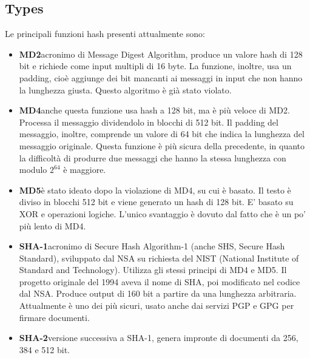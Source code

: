 \subsection{Types}
Le principali funzioni hash presenti attualmente sono:
\begin{itemize}
    \item \textbf{MD2}\newline  acronimo di Message Digest Algorithm, produce un valore hash di 128 bit e richiede come input multipli di 16 byte. La funzione, inoltre, usa un padding, cioè aggiunge dei bit mancanti ai messaggi in input che non hanno la lunghezza giusta. Questo algoritmo è già stato violato.
    \item \textbf{MD4}\newline anche questa funzione usa hash a 128 bit, ma è più veloce di MD2. Processa il messaggio dividendolo in blocchi di 512 bit. Il padding del messaggio, inoltre, comprende un valore di 64 bit che indica la lunghezza del messaggio originale. Questa funzione è più sicura della precedente, in quanto la difficoltà di produrre due messaggi che hanno la stessa lunghezza con modulo \(2^{64}\) è maggiore.
    \item \textbf{MD5}\newline è stato ideato dopo la violazione di MD4, su cui è basato. Il testo è diviso in blocchi 512 bit e viene generato un hash di 128 bit. E’ basato su XOR e operazioni logiche. L’unico svantaggio è dovuto dal fatto che è un po’ più lento di MD4.
    \item \textbf{SHA-1}\newline  acronimo di Secure Hash Algorithm-1 (anche SHS, Secure Hash Standard), sviluppato dal NSA su richiesta del NIST (National Institute of Standard and Technology). Utilizza gli stessi principi di MD4 e MD5. Il progetto originale del 1994 aveva il nome di SHA, poi modificato nel codice dal NSA. Produce output di 160 bit a partire da una lunghezza arbitraria. Attualmente è uno dei più sicuri, usato anche dai servizi PGP e GPG per firmare documenti.
    \item \textbf{SHA-2}\newline versione successiva a SHA-1, genera impronte di documenti da 256, 384 e 512 bit.
\end{itemize}
